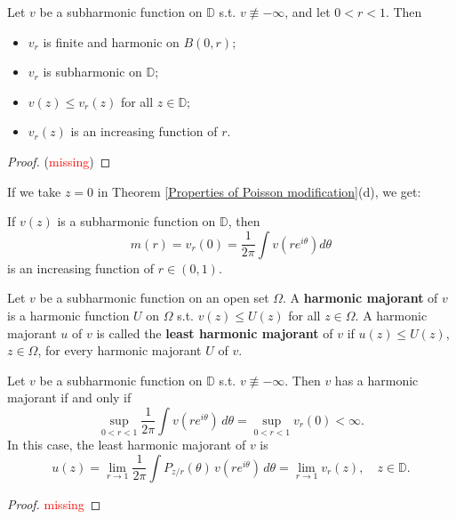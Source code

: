 \begin{theorem}\label{Properties of Poisson modification}
Let $v$ be a subharmonic function on $\mathbb{D}$ s.t. $v\not\equiv-\infty$, and let $0<r<1$.
Then
\begin{itemize}
  \item[(a)] $v_r$ is finite and harmonic on $B(0,r)$;
  \item[(b)] $v_r$ is subharmonic on $\mathbb{D}$;
  \item[(c)] $v(z)\leq v_r(z)$ for all $z\in\mathbb{D}$;
  \item[(d)] $v_r(z)$ is an increasing function of $r$.
\end{itemize}
\end{theorem}
\begin{proof}
(\textcolor{red}{missing})
\end{proof}
If we take $z=0$ in Theorem \ref{Properties of Poisson modification}(d), we get:
\begin{corollary}
If $v(z)$ is a subharmonic function on $\mathbb{D}$, then
\begin{equation*}
  m(r)=v_r(0)=\frac{1}{2\pi}\int v(r e^{i\theta})d\theta
\end{equation*}
is an increasing function of $r\in(0,1)$.
\end{corollary}

\begin{definition}\label{Harmonic majorant}
Let $v$ be a subharmonic function on an open set $\Omega$. A \textbf{harmonic majorant} of $v$
is a harmonic function $U$ on $\Omega$ s.t. $v(z)\leq U(z)$ for all $z\in\Omega$. A harmonic
majorant $u$ of $v$ is called the \textbf{least harmonic majorant} of $v$ if $u(z)\leq U(z)$,
$z\in\Omega$, for every harmonic majorant $U$ of $v$.
\end{definition}

\begin{theorem}\label{Harmonic majorant criterion}
Let $v$ be a subharmonic function on $\mathbb{D}$ s.t. $v\not\equiv-\infty$. Then $v$ has a
harmonic majorant if and only if
\begin{equation*}
  \sup_{0<r<1}\frac{1}{2\pi}\int v(re^{i\theta})\, d\theta=\sup_{0<r<1}v_r(0)<\infty.
\end{equation*}
In this case, the least harmonic majorant of $v$ is
\begin{equation*}
  u(z)=\lim_{r\rightarrow 1}\frac{1}{2\pi}\int P_{z/r}(\theta)\, v(re^{i\theta})\, d\theta
  =\lim_{r\rightarrow 1}v_r(z),\quad z\in\mathbb{D}.
\end{equation*}
\end{theorem}

\begin{proof}
\textcolor{red}{missing}
\end{proof}